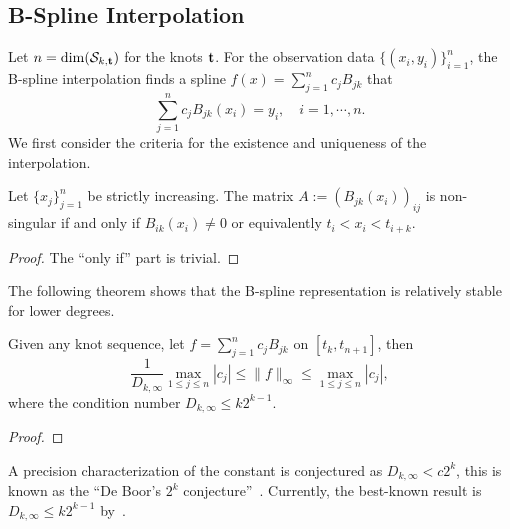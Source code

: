 \subsection{B-Spline Interpolation}
\label{SSec: 2-B-SPL-INT}
Let $n = \dim(\mathcal S_{k, \mathbf t})$ for the knots $\mathbf t$. For the observation data $\{(x_i, y_i)\}_{i=1}^n$, the B-spline interpolation finds a spline $f(x) = \sum_{j=1}^n c_j B_{jk}$ that 
\begin{equation}
    \sum_{j=1}^n c_j B_{jk}(x_i) = y_i, \quad i = 1,\cdots, n.
\end{equation}
We first consider the criteria for the existence and uniqueness of the interpolation.
\begin{theorem}
Let $\{x_j\}_{j=1}^n$ be strictly increasing. The matrix $A:= (B_{jk}(x_i))_{ij}$ is non-singular if and only if $B_{ik}(x_i) \neq 0$ or equivalently $t_i < x_i < t_{i+k}$.
\end{theorem}
\begin{proof}
    The ``only if'' part is trivial.
\end{proof}
The following theorem shows that the B-spline representation is relatively stable for lower degrees. 
\begin{theorem}
    \label{Thm: 2-B-SPL-GOO-CON}
    Given any knot sequence, let $f = \sum_{j=1}^n c_j B_{jk}$ on $[t_k, t_{n+1}]$, then 
    \begin{equation}
        \frac{1}{D_{k,\infty}} \max_{1\le j\le n} |c_j| \le \|f\|_{\infty} \le \max_{1\le j \le n} |c_{j}|,
    \end{equation}
    where the condition number $D_{k,\infty} \le k 2^{k - 1}$. 
\end{theorem}
\begin{proof}
    
\end{proof}
A precision characterization of the constant is conjectured as $D_{k,\infty} < c 2^{k}$, this is known as the ``De Boor's $2^k$ conjecture''~\cite{de1990exact}. Currently, the best-known result is $D_{k,\infty} \le k 2^{k-1}$ by~\cite{scherer1999new}. 






